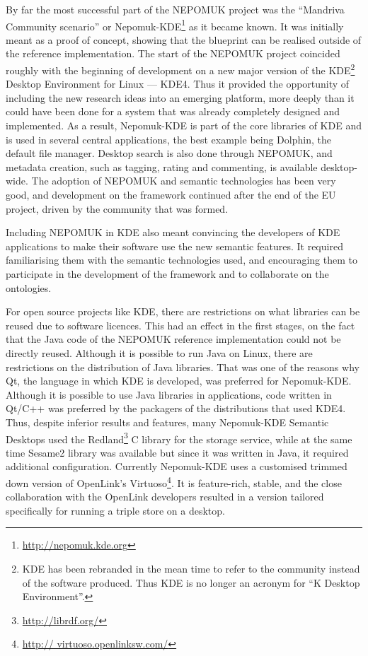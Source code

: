 By far the most successful part of the NEPOMUK project was the ``Mandriva Community scenario'' \cite{Lauriere2006} or Nepomuk-KDE\footnote{\url{http://nepomuk.kde.org}} as it became known. It was initially meant as a proof of concept, showing that the blueprint can be realised outside of the reference implementation. The start of the NEPOMUK project coincided roughly with the beginning of development on a new major version of the KDE\footnote{KDE has been rebranded in the mean time to refer to the community instead of the software produced. Thus KDE is no longer an acronym for ``K Desktop Environment''.} Desktop Environment for Linux --- KDE4. Thus it provided the opportunity of including the new research ideas into an emerging platform, more deeply than it could have been done for a system that was already completely designed and implemented. As a result, Nepomuk-KDE is part of the core libraries of KDE and is used in several central applications, the best example being Dolphin, the default file manager. 
Desktop search is also done through NEPOMUK, and metadata creation, such as tagging, rating and commenting, is available desktop-wide. The adoption of NEPOMUK and semantic technologies has been very good, and development on the framework continued after the end of the EU project, driven by the community that was formed.

Including NEPOMUK in KDE also meant convincing the developers of KDE applications to make their software use the new semantic features. It required familiarising them with the semantic technologies used, and encouraging them to participate in the development of the framework and to collaborate on the ontologies. 

For open source projects like KDE, there are restrictions on what libraries can be reused due to software licences. This had an effect in the first stages, on the fact that the Java code of the NEPOMUK reference implementation could not be directly reused. Although it is possible to run Java on Linux, there are restrictions on the distribution of Java libraries. That was one of the reasons why Qt, the language in which KDE is developed, was preferred for Nepomuk-KDE. Although it is possible to use Java libraries in applications, code written in Qt/C++ was preferred by the packagers of the distributions that used KDE4. Thus, despite inferior results and features, many Nepomuk-KDE Semantic Desktops used the Redland\footnote{\url{http://librdf.org/}} C library for the storage service, while at the same time Sesame2 library was available but since it was written in Java, it required additional configuration. Currently Nepomuk-KDE uses a customised trimmed down version of OpenLink's Virtuoso\footnote{\url{http://
virtuoso.openlinksw.com/}}. It is feature-rich, stable, and the close collaboration with the OpenLink developers resulted in a version tailored specifically for running a triple store on a desktop.


